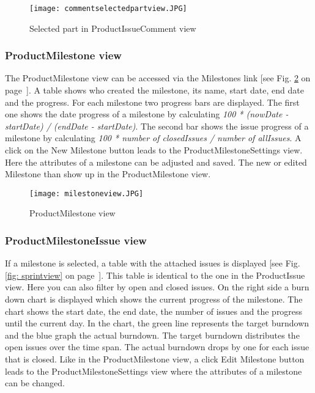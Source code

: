 \begin{figure}[h]
    \centering
    \texttt{[image: commentselectedpartview.JPG]}
    \caption{Selected part in ProductIssueComment view}
    \label{fig: commentselectedpartview}
\end{figure}

\subsubsection*{ProductMilestone view}

The ProductMilestone view can be accessed via the Milestones link [see Fig. \ref{fig: milestoneview} on page~\pageref{fig: milestoneview}]. A table shows who created the milestone, its name, start date, end date and the progress. For each milestone two progress bars are displayed. The first one shows the date progress of a milestone by calculating \textit{100 * (nowDate - startDate) / (endDate - startDate)}. The second bar shows the issue progress of a milestone by calculating \textit{100 * number of closedIssues / number of allIssues}.
A click on the New Milestone button leads to the ProductMilestoneSettings view. Here the attributes of a milestone can be adjusted and saved. The new or edited Milestone than show up in the ProductMilestone view.

\begin{figure}[h]
    \centering
    \texttt{[image: milestoneview.JPG]}
    \caption{ProductMilestone view}
    \label{fig: milestoneview}
\end{figure}

\subsubsection*{ProductMilestoneIssue view}

If a milestone is selected, a table with the attached issues is displayed [see Fig. \ref{fig: sprintview} on page~\pageref{fig: sprintview}]. This table is identical to the one in the ProductIssue view. Here you can also filter by open and closed issues. On the right side a burn down chart is displayed which shows the current progress of the milestone. The chart shows the start date, the end date, the number of issues and the progress until the current day. In the chart, the green line represents the target burndown and the blue graph the actual burndown. The target burndown distributes the open issues over the time span. The actual burndown drops by one for each issue that is closed.  Like in the ProductMilestone view, a click Edit Milestone button leads to the ProductMilestoneSettings view where the attributes of a milestone can be changed.

